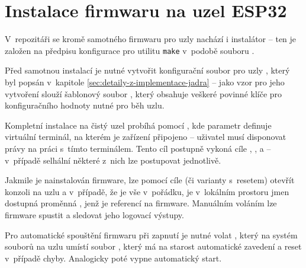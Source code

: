 \chapter{Instalace firmwaru na uzel ESP32}\label{ch:instalator}

V~repozitáři  se kromě samotného firmwaru pro uzly nachází i instalátor --
ten je založen na předpisu konfigurace pro utilitu \texttt{make} v~podobě souboru .

Před samotnou instalací je nutné vytvořit konfigurační soubor pro uzly , který byl popsán v~kapitole
\ref{sec:detaily-z-implementace-jadra} -- jako vzor pro jeho vytvoření slouží šablonový soubor
, který obsahuje veškeré povinné klíče pro konfiguračního hodnoty nutné pro běh uzlu.

Kompletní instalace na čistý uzel probíhá pomocí \mbox{}, kde
parametr  definuje virtuální terminál, na kterém je zařízení připojeno -- uživatel musí disponovat právy na
práci s~tímto terminálem. Tento cíl postupně vykoná cíle , ,
 a  -- v~případě selhální některé z~nich lze postupovat jednotlivě.

Jakmile je nainstalován firmware, lze pomocí cíle  (či varianty s~resetem) otevřít konzoli na uzlu a
v~případě, že je vše v~pořádku, je v~lokálním prostoru jmen dostupná proměnná , jenž je referencí na firmware.
Manuálním voláním  lze firmware spustit a sledovat jeho logovací výstupy.

Pro automatické spouštění firmwaru při zapnutí je nutné volat , který na systém
souborů na uzlu umístí soubor , který má na starost automatické zavedení a reset v~případě chyby.
Analogicky poté  vypne automatický start.

